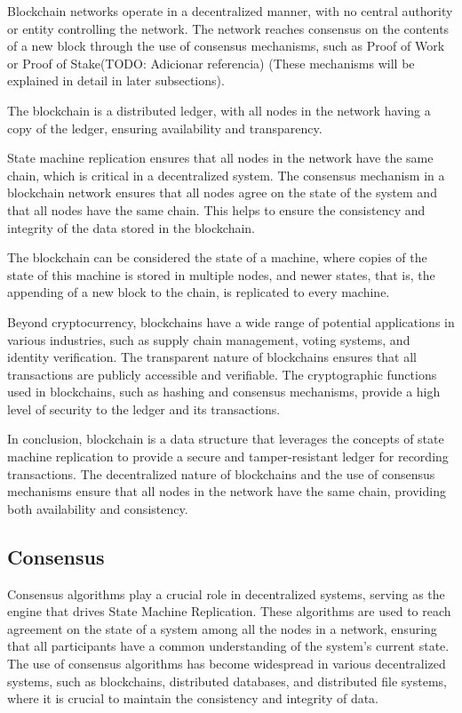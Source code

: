 Blockchain networks operate in a decentralized manner, with no central authority or entity controlling the network. 
The network reaches consensus on the contents of a new block through the use of consensus mechanisms, such as Proof of Work or Proof of Stake(TODO: Adicionar referencia) (These mechanisms will be explained in detail in later subsections).

The blockchain is a distributed ledger, with all nodes in the network having a copy of the ledger, ensuring availability and transparency.

State machine replication ensures that all nodes in the network have the same chain, which is critical in a decentralized system. The consensus mechanism in a blockchain network ensures that all nodes agree on the state of the system and that all nodes have the same chain. This helps to ensure the consistency and integrity of the data stored in the blockchain.

The blockchain can be considered the state of a machine, where copies of the state of this machine is stored in multiple nodes, and newer states, that is, the appending of a new block to the chain, is replicated to every machine.

Beyond cryptocurrency, blockchains have a wide range of potential applications in various industries, such as supply chain management, voting systems, and identity verification. The transparent nature of blockchains ensures that all transactions are publicly accessible and verifiable. The cryptographic functions used in blockchains, such as hashing and consensus mechanisms, provide a high level of security to the ledger and its transactions.

In conclusion, blockchain is a data structure that leverages the concepts of state machine replication to provide a secure and tamper-resistant ledger for recording transactions. The decentralized nature of blockchains and the use of consensus mechanisms ensure that all nodes in the network have the same chain, providing both availability and consistency.

\subsection*{\textbf{Consensus}}
Consensus algorithms play a crucial role in decentralized systems, serving as the engine that drives State Machine Replication. These algorithms are used to reach agreement on the state of a system among all the nodes in a network, ensuring that all participants have a common understanding of the system's current state. The use of consensus algorithms has become widespread in various decentralized systems, such as blockchains, distributed databases, and distributed file systems, where it is crucial to maintain the consistency and integrity of data.

